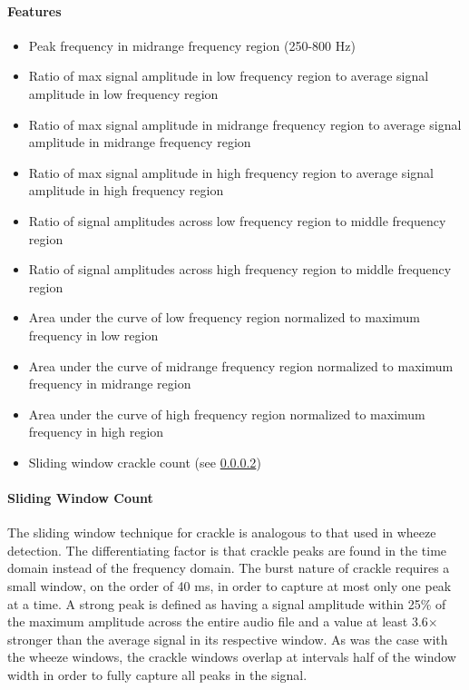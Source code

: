 \documentclass{article}
\begin{document}
\paragraph{Features}

\begin{itemize}[noitemsep,nolistsep]
\item
	Peak frequency in midrange frequency region (250-800 Hz)\\
\item
	Ratio of max signal amplitude in low frequency region to average signal amplitude in low frequency region\\
\item
	Ratio of max signal amplitude in midrange frequency region to average signal amplitude in midrange frequency region\\
\item
	Ratio of max signal amplitude in high frequency region to average signal amplitude in high frequency region\\
\item
	Ratio of signal amplitudes across low frequency region to middle frequency region\\
\item
	Ratio of signal amplitudes across high frequency region to middle frequency region\\
\item
	Area under the curve of low frequency region normalized to maximum frequency in low region\\
\item
	Area under the curve of midrange frequency region normalized to maximum frequency in midrange region\\
\item
	Area under the curve of high frequency region normalized to maximum frequency in high region\\
\item
	Sliding window crackle count (see \ref{Crackle Sliding Window})\\
\end{itemize}

\paragraph{Sliding Window Count}\label{Crackle Sliding Window}

The sliding window technique for crackle is analogous to that used in wheeze detection. The differentiating factor is that crackle peaks are found in the time domain instead of the frequency domain. The burst nature of crackle requires a small window, on the order of 40 ms, in order to capture at most only one peak at a time. A strong peak is defined as having a signal amplitude within 25\% of the maximum amplitude across the entire audio file and a value at least 3.6$\times$ stronger than the average signal in its respective window. As was the case with the wheeze windows, the crackle windows overlap at intervals half of the window width in order to fully capture all peaks in the signal.
\newpage
\end{document}
